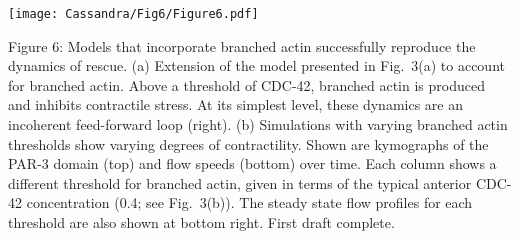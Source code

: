 \documentclass[11pt]{article}
\newcommand{\red}[1]{\color{red}#1\normalcolor}
\newcommand{\6}[1]{#1_{\text{6}}}
\newcommand{\3}[1]{#1_{\text{3}}}
\begin{document}
\newpage 
\begin{center}
\texttt{[image: Cassandra/Fig6/Figure6.pdf]}
\end{center}

\newpage
Figure 6: Models that incorporate branched actin successfully reproduce the dynamics of rescue. (a) Extension of the model presented in Fig.\ 3(a) to account for branched actin. Above a threshold of CDC-42, branched actin is produced and inhibits contractile stress. At its simplest level, these dynamics are an incoherent feed-forward loop (right). (b) Simulations with varying branched actin thresholds show varying degrees of contractility. Shown are kymographs of the PAR-3 domain (top) and flow speeds (bottom) over time. Each column shows a different threshold for branched actin, given in terms of the typical anterior CDC-42 concentration (0.4; see Fig.\ 3(b)). The steady state flow profiles for each threshold are also shown at bottom right. \red{First draft complete.}




\end{document}
